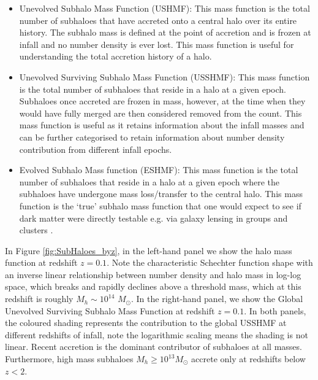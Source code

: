 \begin{itemize}
    \item Unevolved Subhalo Mass Function (USHMF): This mass function is the total number of subhaloes that have accreted onto a central halo over its entire history. The subhalo mass is defined at the point of accretion and is frozen at infall and no number density is ever lost. This mass function is useful for understanding the total accretion history of a halo.
    \item Unevolved Surviving Subhalo Mass Function (USSHMF): This mass function is the total number of subhaloes that reside in a halo at a given epoch. Subhaloes once accreted are frozen in mass, however, at the time when they would have fully merged are then considered removed from the count. This mass function is useful as it retains information about the infall masses and can be further categorised to retain information about number density contribution from different infall epochs.
    \item Evolved Subhalo Mass function (ESHMF): This mass function is the total number of subhaloes that reside in a halo at a given epoch where the subhaloes have undergone mass loss/transfer to the central halo. This mass function is the `true' subhalo mass function that one would expect to see if dark matter were directly testable e.g. via galaxy lensing in groups and clusters \cite{Bartelmann2001WeakLensing}.
\end{itemize}

In Figure \ref{fig:SubHaloes_byz}, in the left-hand panel we show the halo mass function at redshift $z=0.1$. Note the characteristic Schechter function shape with an inverse linear relationship between number density and halo mass in log-log space, which breaks and rapidly declines above a threshold mass, which at this redshift is roughly $M_h\sim 10^{14}$ $M_{\odot}$. In the right-hand panel, we show the Global Unevolved Surviving Subhalo Mass Function at redshift $z=0.1$. In both panels, the coloured shading represents the contribution to the global USSHMF at different redshifts of infall, note the logarithmic scaling means the shading is not linear. Recent accretion is the dominant contributor of subhaloes at all masses. Furthermore, high mass subhaloes $M_h \geq 10^{13} M_{\odot}$ accrete only at redshifts below $z < 2$.

